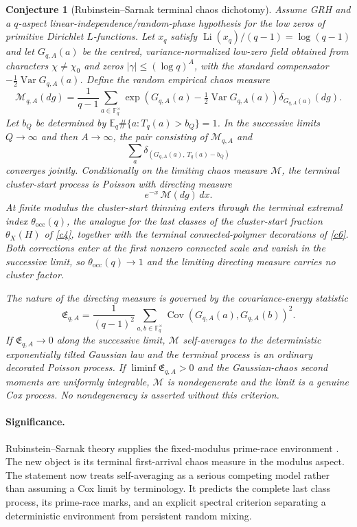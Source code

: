 \documentclass[11pt]{article}
\newtheorem{conjecture}{Conjecture}
\newcommand{\Li}{\operatorname{Li}}
\newcommand{\Var}{\operatorname{Var}}
\newcommand{\Cov}{\operatorname{Cov}}
\newcommand{\E}{\mathbb E}
\newcommand{\Fq}{\mathbb F}
\begin{document}
\begin{conjecture}[Rubinstein--Sarnak terminal chaos dichotomy]\label{c8}
Assume GRH and a $q$-aspect linear-independence/random-phase hypothesis for the low zeros
of primitive Dirichlet $L$-functions.  Let $x_q$ satisfy
$\Li(x_q)/(q-1)=\log(q-1)$ and let $G_{q,A}(a)$ be the centred, variance-normalized
low-zero field obtained from characters $\chi\ne\chi_0$ and zeros
$|\gamma|\le(\log q)^A$, with the standard compensator
$-\tfrac12\Var G_{q,A}(a)$.  Define the random empirical chaos measure
\[
 \mathcal M_{q,A}(dg)=\frac1{q-1}\sum_{a\in\Fq_q^\times}
  \exp\!\left(G_{q,A}(a)-\tfrac12\Var G_{q,A}(a)\right)
  \delta_{G_{q,A}(a)}(dg).
\]
Let $b_Q$ be determined by
$\E_q\#\{a:T_q(a)>b_Q\}=1$.  In the successive limits
$Q\to\infty$ and then $A\to\infty$, the pair consisting of
$\mathcal M_{q,A}$ and
\[
 \sum_a\delta_{(G_{q,A}(a),\,T_q(a)-b_Q)}
\]
converges jointly.  Conditionally on the limiting chaos measure $\mathcal M$, the
terminal cluster-start process is Poisson with directing measure
\[
 e^{-x}\,\mathcal M(dg)\,dx.
\]
At finite modulus the cluster-start thinning enters through the terminal extremal
index $\theta_{\mathrm{occ}}(q)$, the analogue for the last classes of the
cluster-start fraction $\theta_X(H)$ of \cref{c4}, together with the terminal
connected-polymer decorations of \cref{c6}.  Both corrections enter at the first
nonzero connected scale and vanish in the successive limit, so
$\theta_{\mathrm{occ}}(q)\to1$ and the limiting directing measure carries no
cluster factor.

The nature of the directing measure is governed by the covariance-energy statistic
\[
 \mathfrak E_{q,A}=\frac1{(q-1)^2}
 \sum_{a,b\in\Fq_q^\times}
 \Cov(G_{q,A}(a),G_{q,A}(b))^2.
\]
If $\mathfrak E_{q,A}\to0$ along the successive limit, $\mathcal M$ self-averages to the
deterministic exponentially tilted Gaussian law and the terminal process is an ordinary
decorated Poisson process.  If $\liminf\mathfrak E_{q,A}>0$ and the Gaussian-chaos
second moments are uniformly integrable, $\mathcal M$ is nondegenerate and the limit is
a genuine Cox process.  No nondegeneracy is asserted without this criterion.
\end{conjecture}

\paragraph{Significance.}
Rubinstein--Sarnak theory supplies the fixed-modulus prime-race environment
\cite{RubinsteinSarnak}.  The new object is its terminal first-arrival chaos measure in
the modulus aspect.  The statement now treats self-averaging as a serious competing
model rather than assuming a Cox limit by terminology.  It predicts the complete last
class process, its prime-race marks, and an explicit spectral criterion separating a
deterministic environment from persistent random mixing.
\end{document}
